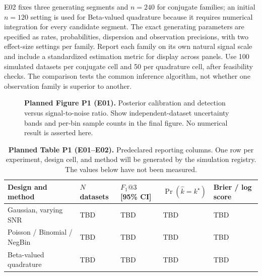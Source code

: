 E02 fixes three generating segments and $n=240$ for conjugate families; an
initial $n=120$ setting is used for Beta-valued quadrature because it requires
numerical integration for every candidate segment. The exact generating
parameters are specified as rates, probabilities, dispersion and observation
precisions, with two effect-size settings per family. Report each family on
its own natural signal scale and include a standardized estimation metric for
display across panels. Use 100 simulated datasets per conjugate cell
and 50 per quadrature cell, after feasibility checks. The comparison tests
the common inference algorithm, not whether one observation family is superior
to another.

\begin{figure}[!htbp]
\centering
{}
\hfill
{}
\caption{\textbf{Planned Figure P1 (E01).} Posterior calibration and detection
versus signal-to-noise ratio. Show independent-dataset uncertainty bands and
per-bin sample counts in the final figure. No numerical result is asserted here.}
\label{fig:planned-calibration-paper}
\end{figure}

\begin{table}[!htbp]
\centering\small
\caption{\textbf{Planned Table P1 (E01--E02).} Predeclared reporting columns.
One row per experiment, design cell, and method will be generated by the
simulation registry. The values below have not been measured.}
\label{tab:planned-recovery-paper}
\begin{tabularx}{0.94\textwidth}{@{}L{0.29\textwidth}L{0.15\textwidth}L{0.15\textwidth}L{0.15\textwidth}Y@{}}
\toprule
Design and method & $N$ datasets & $F_1@3$ [95\% CI] & $\Pr(\widehat k=k^\star)$ & Brier / log score \\
\midrule
Gaussian, varying SNR & TBD & TBD & TBD & TBD \\
Poisson / Binomial / NegBin & TBD & TBD & TBD & TBD \\
Beta-valued quadrature & TBD & TBD & TBD & TBD \\
\bottomrule
\end{tabularx}
\end{table}

